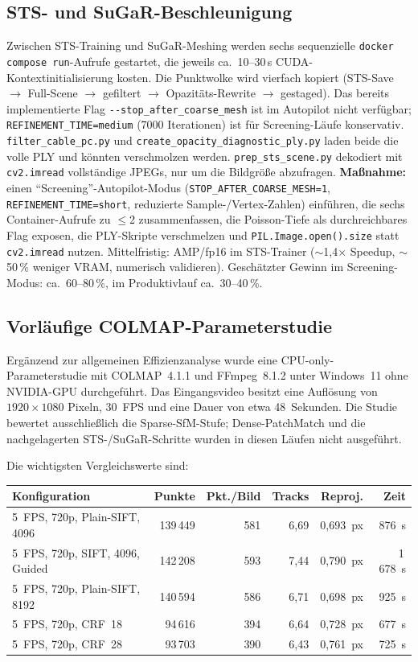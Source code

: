 \documentclass[12pt,a4paper]{article}
\begin{document}
\subsection{STS- und SuGaR-Beschleunigung}
Zwischen STS-Training und SuGaR-Meshing werden sechs sequenzielle
\texttt{docker compose run}-Aufrufe gestartet, die jeweils ca.~10--30\,s
CUDA-Kontextinitialisierung kosten. Die Punktwolke wird vierfach kopiert
(STS-Save $\to$ Full-Scene $\to$ gefiltert $\to$ Opazitäts-Rewrite $\to$
gestaged). Das bereits implementierte Flag \texttt{-{}-stop\_after\_coarse\_mesh}
ist im Autopilot nicht verfügbar; \texttt{REFINEMENT\_TIME=medium} (7000
Iterationen) ist für Screening-Läufe konservativ.
\texttt{filter\_cable\_pc.py} und \texttt{create\_opacity\_diagnostic\_ply.py}
laden beide die volle PLY und könnten verschmolzen werden.
\texttt{prep\_sts\_scene.py} dekodiert mit \texttt{cv2.imread} vollständige
JPEGs, nur um die Bildgröße abzufragen. \textbf{Maßnahme:} einen
``Screening''-Autopilot-Modus (\texttt{STOP\_AFTER\_COARSE\_MESH=1},
\texttt{REFINEMENT\_TIME=short}, reduzierte Sample-/Vertex-Zahlen) einführen,
die sechs Container-Aufrufe zu $\leq$2 zusammenfassen, die Poisson-Tiefe als
durchreichbares Flag exposen, die PLY-Skripte verschmelzen und
\texttt{PIL.Image.open().size} statt \texttt{cv2.imread} nutzen. Mittelfristig:
AMP/fp16 im STS-Trainer ($\sim$1{,}4$\times$ Speedup, $\sim$50\,\% weniger
VRAM, numerisch validieren). Geschätzter Gewinn im Screening-Modus:
ca.~60--80\,\%, im Produktivlauf ca.~30--40\,\%.

\subsection{Vorläufige COLMAP-Parameterstudie}
Ergänzend zur allgemeinen Effizienzanalyse wurde eine CPU-only-
Parameterstudie mit COLMAP~4.1.1 und FFmpeg~8.1.2 unter Windows~11 ohne
NVIDIA-GPU durchgeführt. Das Eingangsvideo besitzt eine Auflösung von
$1920\times1080$ Pixeln, 30~FPS und eine Dauer von etwa 48~Sekunden. Die
Studie bewertet ausschließlich die Sparse-SfM-Stufe; Dense-PatchMatch und die
nachgelagerten STS-/SuGaR-Schritte wurden in diesen Läufen nicht ausgeführt.

Die wichtigsten Vergleichswerte sind:

\begin{center}
\small
\begin{tabularx}{\textwidth}{Xrrrrr}
\textbf{Konfiguration} & \textbf{Punkte} & \textbf{Pkt./Bild} &
\textbf{Tracks} & \textbf{Reproj.} & \textbf{Zeit}\\
\hline
5~FPS, 720p, Plain-SIFT, 4096 & 139\,449 & 581 & 6,69 & 0,693~px & 876~s\\
5~FPS, 720p, SIFT, 4096, Guided & 142\,208 & 593 & 7,44 & 0,790~px & 1\,678~s\\
5~FPS, 720p, Plain-SIFT, 8192 & 140\,594 & 586 & 6,71 & 0,698~px & 925~s\\
5~FPS, 720p, CRF~18 & 94\,616 & 394 & 6,64 & 0,728~px & 677~s\\
5~FPS, 720p, CRF~28 & 93\,703 & 390 & 6,43 & 0,761~px & 725~s\\
\end{tabularx}
\end{center}
\end{document}

